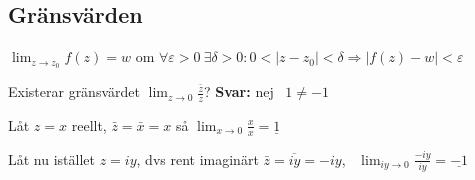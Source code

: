 \subsection{Gränsvärden}
\begin{definition}
$\displaystyle\lim_{z \to z_0} f(z) = w$ om $\forall \varepsilon > 0 \ \exists \delta > 0 : 0 < |z - z_0| < \delta \Rightarrow |f(z) - w| < \varepsilon$
\end{definition}

\begin{example}
Existerar gränsvärdet $\displaystyle\lim_{z \to 0} \frac{\bar{z}}{z}$? \quad \textcolor{magenta!80!black}{\textbf{Svar:} nej \ $1 \neq -1$}

Låt $z = x$ reellt, $\bar{z} = \bar{x} = x$ så $\displaystyle\lim_{x \to 0} \frac{x}{x} = \underline{1}$

Låt nu istället $z = iy$, dvs rent imaginärt $\bar{z} = \overline{iy} = -iy$, \ $\displaystyle\lim_{iy \to 0} \frac{-iy}{iy} = \underline{-1}$
\end{example}
